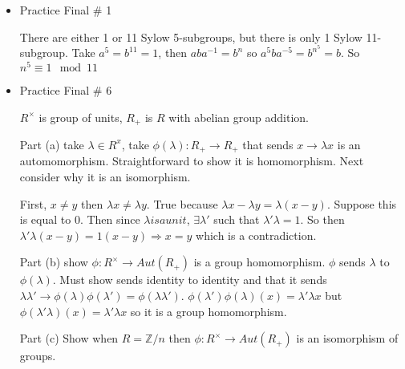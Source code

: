 \documentclass[12pt]{article}
\begin{document}
\begin{itemize}
    \item
        Practice Final \# 1

        There are either 1 or 11 Sylow 5-subgroups, but there is only 1 Sylow
        11-subgroup. Take $a^5 = b^{11} = 1$, then $aba^{-1} = b^n$ so
        $a^5ba^{-5} = b^{n^5} = b$. So $n^5 \equiv 1 \mod 11$

    \item
        Practice Final \# 6

        $R^\times$ is group of units, $R_+$ is $R$ with abelian group addition.

        Part (a) take $\lambda \in R^x$, take $\phi(\lambda): R_+ \rightarrow
        R_+$ that sends $x \rightarrow \lambda x$ is an automomorphism.
        Straightforward to show it is homomorphism. Next consider why it is an
        isomorphism.

        First, $x \ne y $ then $\lambda x \ne \lambda y$. True because $\lambda
        x - \lambda y = \lambda (x - y)$. Suppose this is equal to 0. Then
        since $\lambda is a unit$, $\exists \lambda'$ such that $\lambda '
        \lambda = 1$. So then $\lambda' \lambda (x-y) = 1(x-y) \Rightarrow x =
        y$ which is a contradiction.


        Part (b) show $\phi: R^\times \rightarrow Aut(R_+)$ is a group
        homomorphism. $\phi$ sends $\lambda$ to $\phi(\lambda)$. Must show
        sends identity to identity and that it sends $\lambda \lambda'
        \rightarrow \phi(\lambda)\phi(\lambda') = \phi(\lambda\lambda')$.
        $\phi(\lambda')\phi(\lambda)(x)  = \lambda'\lambda x$ but
        $\phi(\lambda'\lambda)(x) = \lambda'\lambda x$ so it is a group
        homomorphism.

        Part (c) Show when $R = \mathbb{Z}/n$ then $\phi: R^\times \rightarrow
        Aut(R_+)$ is an isomorphism of groups.

\end{itemize}
\end{document}
